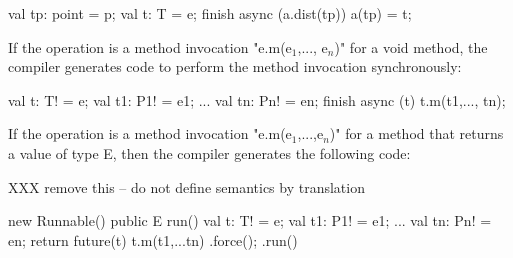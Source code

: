 \begin{xten}
val tp: point = p;
val t: T = e;
finish async (a.dist(tp)) { a(tp) = t; }
\end{xten}

If the operation is a method invocation \xcdmath"e.m(e$_1$,..., e$_n$)"
for a void method, the compiler generates code to
perform the method invocation synchronously:

\begin{xten}
val t: T! = e;
val t1: P1! = e1;
...
val tn: Pn! = en;
finish async (t) {
  t.m(t1,..., tn);
}
\end{xten}


If the operation is a method invocation
\xcdmath"e.m(e$_1$,...,e$_n$)" for a method that returns a value
of type E, then the compiler generates the following code:

XXX remove this -- do not define semantics by translation

\begin{xten}
new Runnable() {
  public E run() {
    val t: T! = e;
    val t1: P1! = e1;
    ...
    val tn: Pn! = en;
    return future(t){ t.m(t1,...tn) }.force();
  }}.run()
\end{xten}


